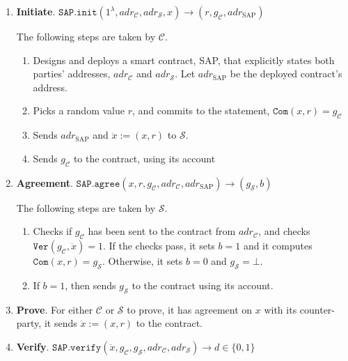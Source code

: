  \begin{enumerate}
 
 \item\textbf{Initiate}. $\mathtt{SAP.init}(1^{\scriptscriptstyle\lambda}, adr_{\scriptscriptstyle\mathcal{C}}, adr_{\scriptscriptstyle\mathcal{S}},x )\rightarrow(r,g_{\scriptscriptstyle \mathcal{C}},adr_{\scriptscriptstyle\text{SAP}})$ 
 
 The following steps are taken   by  $\mathcal C$.
 
  \begin{enumerate}
  \item  Designs and deploys a smart contract, SAP, that  explicitly states both parties'  addresses, $adr_{\scriptscriptstyle\mathcal{C}}$ and  $adr_{\scriptscriptstyle\mathcal{S}}$. Let $adr_{\scriptscriptstyle\text{SAP}}$ be the deployed contract's address. 

   \item  Picks a random value $r$, and commits to the statement, $\mathtt{Com}(x,r)=g_{\scriptscriptstyle \mathcal{C}}$
   \item Sends $adr_{\scriptscriptstyle\text{SAP}}$ and $\ddot{x}:=(x,r)$  to  $\mathcal S$. 
   \item Sends $g_{\scriptscriptstyle\mathcal C}$ to the contract, using its account 
    \end{enumerate}
    
    \item\textbf{Agreement}. $\mathtt{SAP.agree}(x,r,g_{\scriptscriptstyle \mathcal{C}},adr_{\scriptscriptstyle\mathcal{C}},adr_{\scriptscriptstyle\text{SAP}})\rightarrow (g_{\scriptscriptstyle \mathcal{S}},b)$
    
     The following steps are taken   by  $\mathcal S$.
     
     \begin{enumerate}
 
   \item Checks if $g_{\scriptscriptstyle \mathcal{C}}$ has been sent to the contract from $adr_{\scriptscriptstyle \mathcal{C}}$, and checks $\mathtt{Ver}(g_{\scriptscriptstyle\mathcal C}, \ddot{x})=1$. If the checks pass, it sets $b=1$ and   it computes $\mathtt{Com}(x,r)=g_{\scriptscriptstyle\mathcal S}$. Otherwise, it sets $b=0$ and $g_{\scriptscriptstyle\mathcal S}=\bot$.
   
   \item  If $b=1$, then sends $g_{\scriptscriptstyle\mathcal S}$ to the contract using its account.
    \end{enumerate}
   \item\textbf{Prove}. For either $\mathcal C$ or $\mathcal S$ to prove, it has agreement on $x$ with its counter-party, it sends $\ddot{x}:=(x, r)$  to the contract. 
 \item\textbf{Verify}. $\mathtt{SAP.verify}(\ddot{x}, g_{\scriptscriptstyle\mathcal C},g_{\scriptscriptstyle\mathcal S},adr_{\scriptscriptstyle\mathcal{C}}, adr_{\scriptscriptstyle\mathcal{S}})\rightarrow d\in\{0,1\}$
 

\end{enumerate}
